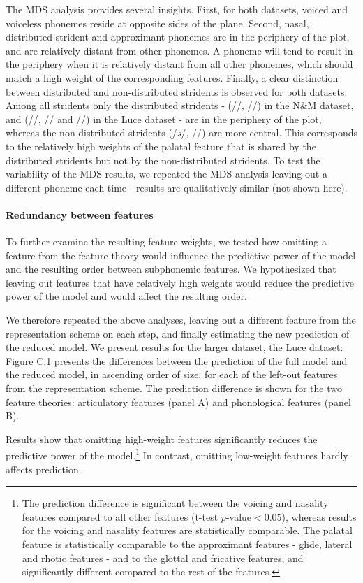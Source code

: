 The MDS analysis provides several insights. First, for both datasets, voiced and voiceless phonemes reside at opposite sides of the plane. Second, nasal, distributed-strident and approximant phonemes are in the periphery of the plot, and are relatively distant from other phonemes. A phoneme will tend to result in the periphery when it is relatively distant from all other phonemes, which should match a high weight of the corresponding features. Finally, a clear distinction between distributed and non-distributed stridents is observed for both datasets. Among all stridents only the distributed stridents - (//, //) in the N\&M dataset, and (//, // and //) in the Luce dataset - are in the periphery of the plot, whereas the non-distributed stridents (/\textit{s}/, //) are more central. This corresponds to the relatively high weights of the palatal feature that is shared by the distributed stridents but not by the non-distributed stridents. To test the variability of the MDS results, we repeated the MDS analysis leaving-out a different phoneme each time - results are qualitatively similar (not shown here).

\paragraph{Redundancy between features} To further examine the resulting feature weights, we tested how omitting a feature from the feature theory would influence the predictive power of the model and the resulting order between subphonemic features. We hypothesized that leaving out features that have relatively high weights would reduce the predictive power of the model and would affect the resulting order.

We therefore repeated the above analyses, leaving out a different feature from the representation scheme on each step, and finally estimating the new prediction of the reduced model. We present results for the larger dataset, the Luce dataset: Figure C.1 presents the differences between the prediction of the full model and the reduced model, in ascending order of size, for each of the left-out features from the representation scheme. The prediction difference is shown for the two feature theories: articulatory features (panel A) and phonological features (panel B).

Results show that omitting high-weight features significantly reduces the predictive power of the model.\footnote{The prediction difference is significant between the voicing and nasality features compared to all other features (t-test $p$-value$<0.05$), whereas results for the voicing and nasality features are statistically comparable. The palatal feature is statistically comparable to the approximant features - glide, lateral and rhotic features - and to the glottal and fricative features, and significantly different compared to the rest of the features.} In contrast, omitting low-weight features hardly affects prediction.

